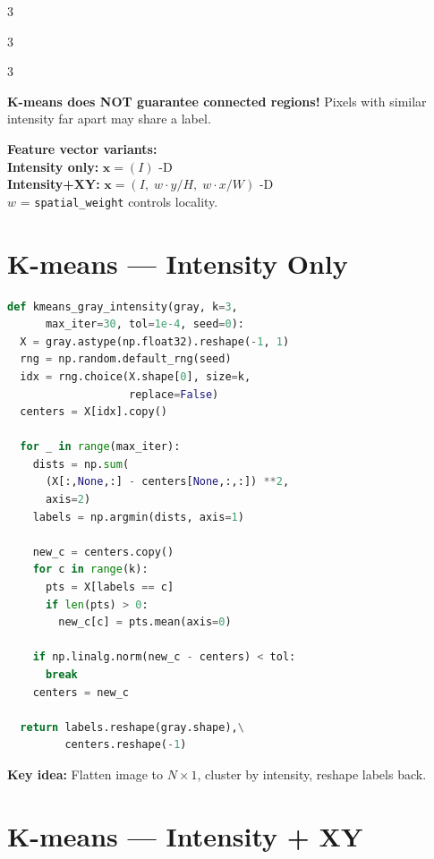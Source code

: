 \documentclass[9pt,landscape,a4paper]{extarticle}
\begin{document}
\begin{multicols*}{3}
\begin{multicols*}{3}
\begin{multicols}{3}
\begin{notebox}
\textbf{K-means does NOT guarantee connected regions!}
Pixels with similar intensity far apart may share a label.
\end{notebox}

\begin{infobox}
\textbf{Feature vector variants:}\\
\textbf{Intensity only:} $\mathbf{x}=(I)$ -D\\
\textbf{Intensity+XY:} $\mathbf{x}=(I,\; w\cdot y/H,\; w\cdot x/W)$ -D\\
$w$ = \texttt{spatial\_weight} controls locality.
\end{infobox}

\section{K-means --- Intensity Only}

\begin{lstlisting}[language=Python]
def kmeans_gray_intensity(gray, k=3,
      max_iter=30, tol=1e-4, seed=0):
  X = gray.astype(np.float32).reshape(-1, 1)
  rng = np.random.default_rng(seed)
  idx = rng.choice(X.shape[0], size=k,
                   replace=False)
  centers = X[idx].copy()

  for _ in range(max_iter):
    dists = np.sum(
      (X[:,None,:] - centers[None,:,:]) **2,
      axis=2)
    labels = np.argmin(dists, axis=1)

    new_c = centers.copy()
    for c in range(k):
      pts = X[labels == c]
      if len(pts) > 0:
        new_c[c] = pts.mean(axis=0)

    if np.linalg.norm(new_c - centers) < tol:
      break
    centers = new_c

  return labels.reshape(gray.shape),\
         centers.reshape(-1)
\end{lstlisting}

\begin{tipbox}
\textbf{Key idea:} Flatten image to $N\times 1$, cluster by intensity, reshape labels back.
\end{tipbox}

\section{K-means --- Intensity + XY}


\end{multicols}
\end{multicols*}
\end{multicols*}
\end{document}

